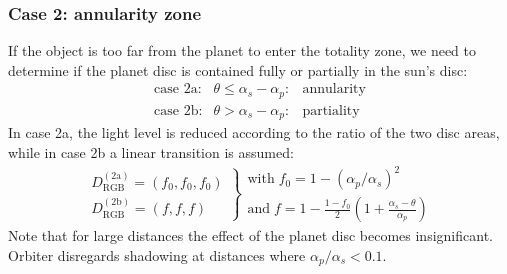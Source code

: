 \documentclass[a4paper]{article}
\begin{document}
\subsubsection{Case 2: annularity zone}\label{sec:noatm_annul}
If the object is too far from the planet to enter the totality zone, we need to determine if the planet disc is contained fully or partially in the sun's disc:
\begin{equation}
\begin{array}{lcl}
\text{case 2a:} & \theta \leq \alpha_s-\alpha_p: & \text{annularity}\\
\text{case 2b:} & \theta > \alpha_s-\alpha_p: & \text{partiality}
\end{array}
\end{equation}
In case 2a, the light level is reduced according to the ratio of the two disc areas, while in case 2b a linear transition is assumed:
\begin{equation}
\left.
\begin{array}{l}
D_\text{RGB}^{(\text{2a})} = (f_0,f_0,f_0)\\
D_\text{RGB}^{(\text{2b})} = (f,f,f)
\end{array}
\right\rbrace
\begin{array}{l}
\text{with}\; f_0 = 1-(\alpha_p/\alpha_s)^2\\
\text{and}\; f = 1-\frac{1-f_0}{2} (1+\frac{\alpha_s-\theta}{\alpha_p})
\end{array}
\end{equation}
Note that for large distances the effect of the planet disc becomes insignificant. Orbiter disregards shadowing at distances where $\alpha_p/\alpha_s < 0.1$.
\end{document}
